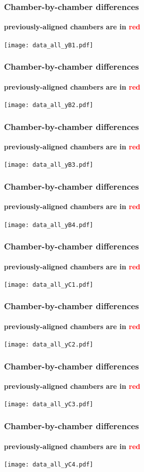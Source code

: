 \documentclass[compress]{beamer}
\begin{document}
\begin{frame}
\frametitle{Chamber-by-chamber differences}
\framesubtitle{previously-aligned chambers are in \textcolor{red}{red}}
\texttt{[image: data\_all\_yB1.pdf]}
\end{frame}

\begin{frame}
\frametitle{Chamber-by-chamber differences}
\framesubtitle{previously-aligned chambers are in \textcolor{red}{red}}
\texttt{[image: data\_all\_yB2.pdf]}
\end{frame}

\begin{frame}
\frametitle{Chamber-by-chamber differences}
\framesubtitle{previously-aligned chambers are in \textcolor{red}{red}}
\texttt{[image: data\_all\_yB3.pdf]}
\end{frame}

\begin{frame}
\frametitle{Chamber-by-chamber differences}
\framesubtitle{previously-aligned chambers are in \textcolor{red}{red}}
\texttt{[image: data\_all\_yB4.pdf]}
\end{frame}

\begin{frame}
\frametitle{Chamber-by-chamber differences}
\framesubtitle{previously-aligned chambers are in \textcolor{red}{red}}
\texttt{[image: data\_all\_yC1.pdf]}
\end{frame}

\begin{frame}
\frametitle{Chamber-by-chamber differences}
\framesubtitle{previously-aligned chambers are in \textcolor{red}{red}}
\texttt{[image: data\_all\_yC2.pdf]}
\end{frame}

\begin{frame}
\frametitle{Chamber-by-chamber differences}
\framesubtitle{previously-aligned chambers are in \textcolor{red}{red}}
\texttt{[image: data\_all\_yC3.pdf]}
\end{frame}

\begin{frame}
\frametitle{Chamber-by-chamber differences}
\framesubtitle{previously-aligned chambers are in \textcolor{red}{red}}
\texttt{[image: data\_all\_yC4.pdf]}
\end{frame}
\end{document}
